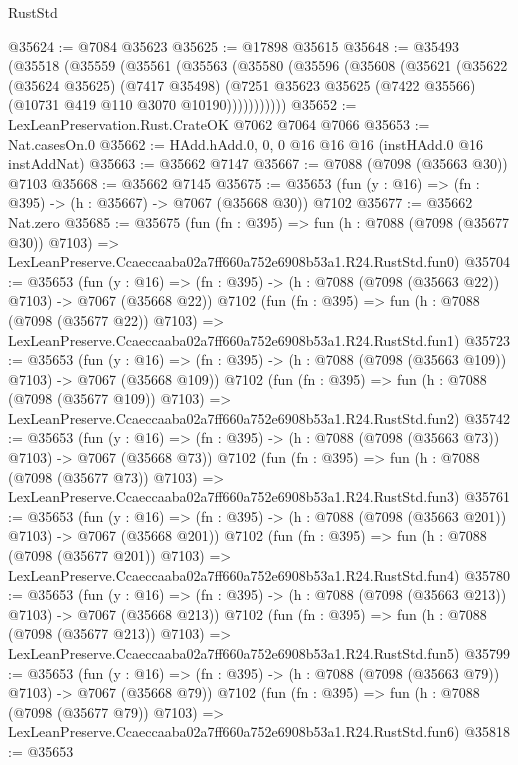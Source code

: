 \begin{lexlean}{RustStd}
\begin{coremodule}
@35624 := @7084 @35623
@35625 := @17898 @35615
@35648 := @35493
    (@35518
      (@35559
        (@35561
          (@35563
            (@35580
              (@35596
                (@35608
                  (@35621
                    (@35622
                      (@35624 @35625)
                      (@7417 @35498)
                      (@7251 @35623 @35625 (@7422 @35566) (@10731 @419 @110 @3070 @10190)))))))))))
@35652 := LexLeanPreservation.Rust.CrateOK @7062 @7064 @7066
@35653 := Nat.casesOn.{0}
@35662 := HAdd.hAdd.{0, 0, 0} @16 @16 @16 (instHAdd.{0} @16 instAddNat)
@35663 := @35662 @7147
@35667 := @7088 (@7098 (@35663 @30)) @7103
@35668 := @35662 @7145
@35675 := @35653 (fun (y : @16) => (fn : @395) -> (h : @35667) -> @7067 (@35668 @30)) @7102
@35677 := @35662 Nat.zero
@35685 := @35675
    (fun (fn : @395) =>
    fun (h : @7088 (@7098 (@35677 @30)) @7103) =>
    LexLeanPreserve.Ccaeccaaba02a7ff660a752e6908b53a1.R24.RustStd.fun0)
@35704 := @35653
    (fun (y : @16) => (fn : @395) -> (h : @7088 (@7098 (@35663 @22)) @7103) -> @7067 (@35668 @22))
    @7102
    (fun (fn : @395) =>
    fun (h : @7088 (@7098 (@35677 @22)) @7103) =>
    LexLeanPreserve.Ccaeccaaba02a7ff660a752e6908b53a1.R24.RustStd.fun1)
@35723 := @35653
    (fun (y : @16) => (fn : @395) -> (h : @7088 (@7098 (@35663 @109)) @7103) -> @7067 (@35668 @109))
    @7102
    (fun (fn : @395) =>
    fun (h : @7088 (@7098 (@35677 @109)) @7103) =>
    LexLeanPreserve.Ccaeccaaba02a7ff660a752e6908b53a1.R24.RustStd.fun2)
@35742 := @35653
    (fun (y : @16) => (fn : @395) -> (h : @7088 (@7098 (@35663 @73)) @7103) -> @7067 (@35668 @73))
    @7102
    (fun (fn : @395) =>
    fun (h : @7088 (@7098 (@35677 @73)) @7103) =>
    LexLeanPreserve.Ccaeccaaba02a7ff660a752e6908b53a1.R24.RustStd.fun3)
@35761 := @35653
    (fun (y : @16) => (fn : @395) -> (h : @7088 (@7098 (@35663 @201)) @7103) -> @7067 (@35668 @201))
    @7102
    (fun (fn : @395) =>
    fun (h : @7088 (@7098 (@35677 @201)) @7103) =>
    LexLeanPreserve.Ccaeccaaba02a7ff660a752e6908b53a1.R24.RustStd.fun4)
@35780 := @35653
    (fun (y : @16) => (fn : @395) -> (h : @7088 (@7098 (@35663 @213)) @7103) -> @7067 (@35668 @213))
    @7102
    (fun (fn : @395) =>
    fun (h : @7088 (@7098 (@35677 @213)) @7103) =>
    LexLeanPreserve.Ccaeccaaba02a7ff660a752e6908b53a1.R24.RustStd.fun5)
@35799 := @35653
    (fun (y : @16) => (fn : @395) -> (h : @7088 (@7098 (@35663 @79)) @7103) -> @7067 (@35668 @79))
    @7102
    (fun (fn : @395) =>
    fun (h : @7088 (@7098 (@35677 @79)) @7103) =>
    LexLeanPreserve.Ccaeccaaba02a7ff660a752e6908b53a1.R24.RustStd.fun6)
@35818 := @35653

\end{coremodule}
\end{lexlean}
